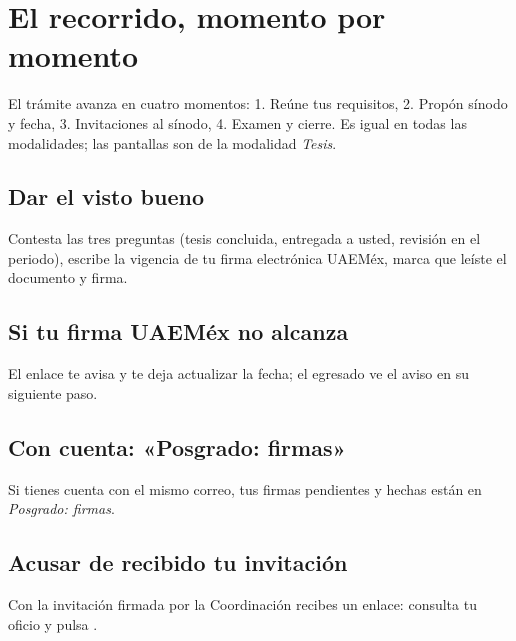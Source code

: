 \section{El recorrido, momento por momento}
El trámite avanza en cuatro momentos: 1. Reúne tus requisitos, 2. Propón sínodo y fecha, 3. Invitaciones al sínodo, 4. Examen y cierre. Es igual en todas las modalidades; las pantallas son de la modalidad \emph{Tesis}.
\subsection{Dar el visto bueno}
Contesta las tres preguntas (tesis concluida, entregada a usted, revisión en el periodo), escribe la vigencia de tu firma electrónica UAEMéx, marca que leíste el documento y firma.
\subsection{Si tu firma UAEMéx no alcanza}
El enlace te avisa y te deja actualizar la fecha; el egresado ve el aviso en su siguiente paso.
\subsection{Con cuenta: «Posgrado: firmas»}
Si tienes cuenta con el mismo correo, tus firmas pendientes y hechas están en \emph{Posgrado: firmas}.
\subsection{Acusar de recibido tu invitación}
Con la invitación firmada por la Coordinación recibes un enlace: consulta tu oficio y pulsa .
